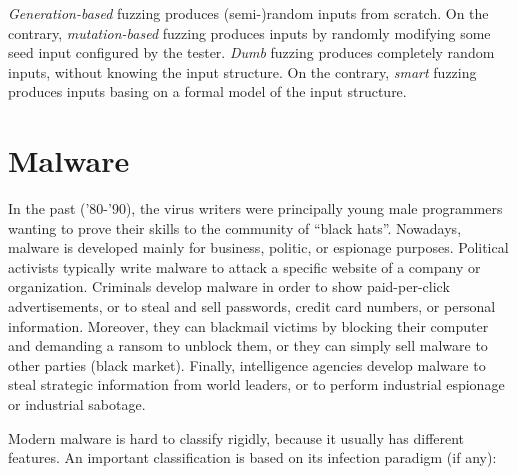 \documentclass[a4paper,12pt]{article}
\begin{document}
\textit{Generation-based} fuzzing produces (semi-)random inputs from scratch. On the contrary, \textit{mutation-based} fuzzing produces inputs by randomly modifying some seed input configured by the tester. \textit{Dumb} fuzzing produces completely random inputs, without knowing the input structure. On the contrary, \textit{smart} fuzzing produces inputs basing on a formal model of the input structure.

\newpage

\section{Malware}
In the past ('80-'90), the virus writers were principally young male programmers wanting to prove their skills to the community of “black hats”. Nowadays, malware is developed mainly for business, politic, or espionage purposes. Political activists typically write malware to attack a specific website of a company or organization. Criminals develop malware in order to show paid-per-click advertisements, or to steal and sell passwords, credit card numbers, or personal information. Moreover, they can blackmail victims by blocking their computer and demanding a ransom to unblock them, or they can simply sell malware to other parties (black market). Finally, intelligence agencies develop malware to steal strategic information from world leaders, or to perform industrial espionage or industrial sabotage.

Modern malware is hard to classify rigidly, because it usually has different features. An important classification is based on its infection paradigm (if any): 
\end{document}
